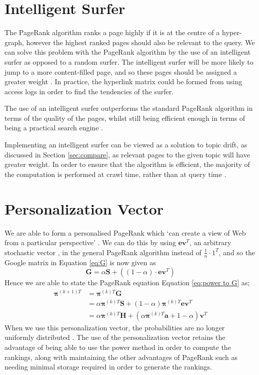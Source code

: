 \documentclass[11pt]{report}
\begin{document}
{\section{Intelligent Surfer} \label{sec:intelligent}

The PageRank algorithm ranks a page highly if it is at the centre of a hyper-graph, however the highest ranked pages should also be relevant to the query. We can solve this problem with the PageRank algorithm by the use of an intelligent surfer as opposed to a random surfer. The intelligent surfer will be more likely to jump to a more content-filled page, and so these pages should be assigned a greater weight \cite{langville}. In practice, the hyperlink matrix could be formed from using access logs in order to find the tendencies of the surfer. 

The use of an intelligent surfer outperforms the standard PageRank algorithm in terms of the quality of the pages, whilst still being efficient enough in terms of being a practical search engine \cite{richardson2002intelligent}. 

Implementing an intelligent surfer can be viewed as a solution to topic drift, as discussed in Section \ref{sec:compare}, as relevant pages to the given topic will have greater weight. In order to ensure that the algorithm is efficient, the majority of the computation is performed at crawl time, rather than at query time \cite{richardson2002intelligent}. 

\section{Personalization Vector} \label{sec:Personalization}

We are able to form a personalised PageRank which `can create a view of Web from a particular perspective' \cite{page1999pagerank}. We can do this by using $\textbf{ev}^T$, an arbitrary stochastic vector \cite{bonato}, in the general PageRank algorithm instead of $\frac{1}{n}\cdot1^T$, and so the Google matrix in Equation \eqref{eq:G} is now given as \begin{equation}\label{eq:Personalisation G}
\textbf{G}=\alpha\textbf{S}+\left((1-\alpha)\cdot\textbf{ev}^T\right)
\end{equation} Hence we are able to state the PageRank equation Equation \eqref{eq:power to G} as; 
\begin{align}
\boldsymbol{\pi}^{(k+1)T} &= \boldsymbol{\pi}^{(k)T}\textbf{G} \nonumber \\
&= \alpha\boldsymbol{\pi}^{(k)T}\textbf{S} + (1-\alpha)\boldsymbol{\pi}^{(k)T}\textbf{ev}^T \nonumber \\
&= \alpha\boldsymbol{\pi}^{(k)T}\textbf{H} + \left(\alpha\boldsymbol{\pi}^{(k)T}\textbf{a} + 1 - \alpha\right)\textbf{v}^T \label{eq:Power personalization}
\end{align}
When we use this personalization vector, the probabilities are no longer uniformly distributed \cite{langville}. The use of the personalization vector retains the advantage of being able to use the power method in order to compute the rankings, along with maintaining the other advantages of PageRank such as needing minimal storage required in order to generate the rankings.

}
\end{document}
